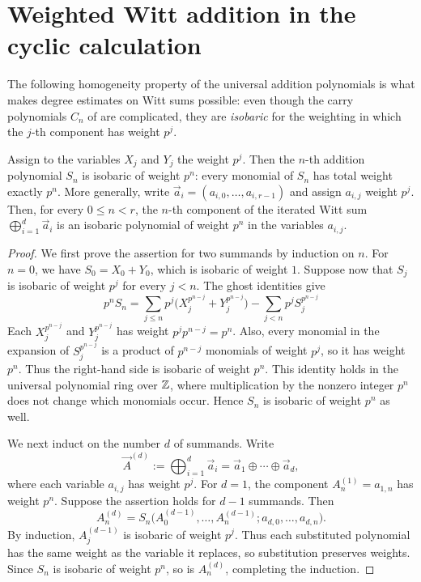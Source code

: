 \section{Weighted Witt addition in the cyclic calculation}

The following homogeneity property of the universal addition polynomials is what
makes degree estimates on Witt sums possible: even though the carry polynomials $C_n$
of  are complicated, they are \emph{isobaric} for the
weighting in which the $j$-th component has weight $p^j$.

\begin{lemma}\label{lemma:witt_addition_isobaric}
Assign to the variables $X_j$ and $Y_j$ the weight $p^j$. Then the $n$-th addition
polynomial $S_n$ is isobaric of weight $p^n$: every monomial of $S_n$ has total weight
exactly $p^n$. More generally, write
$\vec a_i=(a_{i,0},\dots,a_{i,r-1})$ and assign $a_{i,j}$ weight $p^j$.
Then, for every $0\leq n<r$, the $n$-th component of the iterated Witt sum
$\bigoplus_{i=1}^{d}\vec a_i$ is an isobaric polynomial of weight $p^n$ in the
variables $a_{i,j}$.
\end{lemma}

\begin{proof}
We first prove the assertion for two summands by induction on $n$.
For $n=0$, we have $S_0=X_0+Y_0$, which is isobaric of weight $1$.
Suppose now that $S_j$ is isobaric of weight $p^j$ for every $j<n$.
The ghost identities give
\[
p^n S_n = \sum_{j \le n} p^j \bigl(X_j^{p^{n-j}} + Y_j^{p^{n-j}}\bigr)
- \sum_{j < n} p^j S_j^{p^{n-j}}
\]
Each $X_j^{p^{n-j}}$ and $Y_j^{p^{n-j}}$ has weight
$p^j p^{n-j}=p^n$. Also, every monomial in the expansion of
$S_j^{p^{n-j}}$ is a product of $p^{n-j}$ monomials of weight $p^j$,
so it has weight $p^n$. Thus the right-hand side is isobaric of weight
$p^n$. This identity holds in the universal polynomial ring over $\mathbb{Z}$,
where multiplication by the nonzero integer $p^n$ does not change which
monomials occur. Hence $S_n$ is isobaric of weight $p^n$ as well.

We next induct on the number $d$ of summands. Write
\[
\vec A^{(d)}:=\bigoplus_{i=1}^{d}\vec a_i
=\vec a_1\oplus\cdots\oplus\vec a_d,
\]
where each variable $a_{i,j}$ has weight $p^j$. For $d=1$, the component
$A_n^{(1)}=a_{1,n}$ has weight $p^n$. Suppose the assertion holds for
$d-1$ summands. Then
\[
A_n^{(d)}=
S_n\bigl(A_0^{(d-1)},\dots,A_n^{(d-1)};
a_{d,0},\dots,a_{d,n}\bigr).
\]
By induction, $A_j^{(d-1)}$ is isobaric of weight $p^j$.
Thus each substituted polynomial has the same weight as the variable it
replaces, so substitution preserves weights. Since $S_n$ is isobaric of
weight $p^n$, so is $A_n^{(d)}$, completing the induction.
\end{proof}
